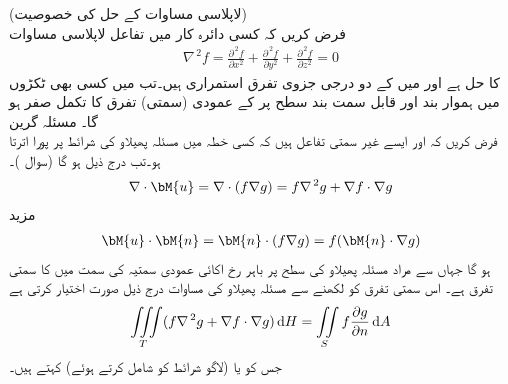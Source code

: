 \quad (لاپلاسی مساوات کے حل کی خصوصیت)\\
فرض کریں کہ کسی دائرہ کار  میں تفاعل  لاپلاسی مساوات
\begin{align*}
\nabla^{\,2}f=\frac{\partial^{\,2} f}{\partial x^2}+\frac{\partial^{\,2} f}{\partial y^2}+\frac{\partial^{\,2} f}{\partial z^2}=0
\end{align*}
کا حل ہے اور  میں  کے دو درجی جزوی تفرق استمراری ہیں۔تب  میں کسی بھی ٹکڑوں میں ہموار  بند اور قابل سمت بند سطح  پر  کے عمودی  (سمتی) تفرق کا تکمل صفر ہو گا۔
\quad مسئلہ گرین\\
فرض کریں کہ  اور  ایسے غیر سمتی تفاعل ہیں کہ کسی خطہ  میں  مسئلہ پھیلاو کی شرائط پر پورا اترتا ہو۔تب درج ذیل ہو گا (سوال )۔
\begin{align*}
\nabla \cdot \bM{u}=\nabla \cdot(f\nabla g)=f\nabla^{\,2}g+\nabla f \cdot \nabla g
\end{align*}
مزید
\begin{align*}
\bM{u}\cdot \bM{n}=\bM{n}\cdot(f\nabla g)=f(\bM{n}\cdot \nabla g)
\end{align*}
ہو گا جہاں  سے مراد مسئلہ پھیلاو کی سطح  پر باہر رخ اکائی عمودی سمتیہ  کی سمت میں  کا سمتی تفرق ہے۔ اس سمتی تفرق کو  لکھنے سے مسئلہ پھیلاو کی مساوات درج ذیل صورت اختیار کرتی ہے
\begin{align}\label{مساوات_خطی_تکمل_گرین_کلیہ_اول}
\iiint\limits_T (f\nabla^{\,2}g+\nabla f\cdot \nabla g)\dif H=\iint\limits_S f\frac{\partial g}{\partial n}\dif A
\end{align}
جس کو   یا (لاگو شرائط کو شامل کرتے ہوئے)  کہتے ہیں۔

